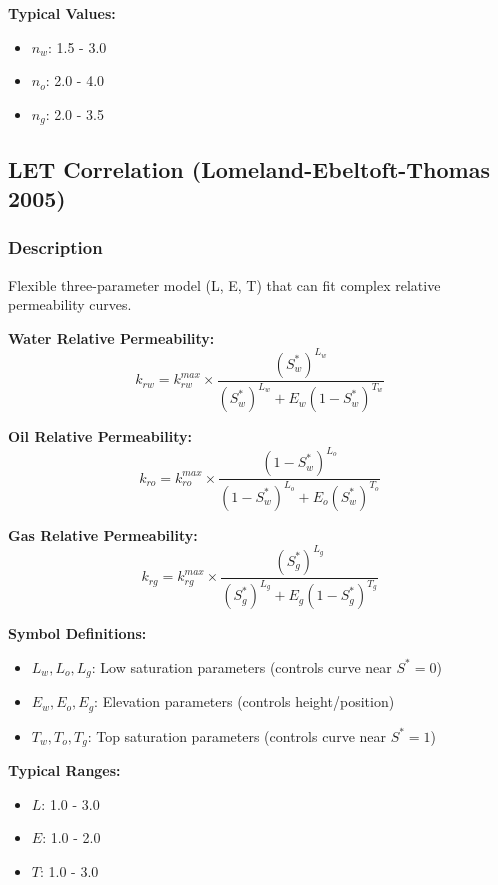 \documentclass[11pt,a4paper]{article}
\newcommand{\symitem}[2]{\item \textbf{#1}: #2}
\begin{document}
\textbf{Typical Values:}
\begin{itemize}
\item $n_w$: 1.5 - 3.0
\item $n_o$: 2.0 - 4.0
\item $n_g$: 2.0 - 3.5
\end{itemize}

\subsection{LET Correlation (Lomeland-Ebeltoft-Thomas 2005)}

\subsubsection{Description}
Flexible three-parameter model (L, E, T) that can fit complex relative permeability curves.

\begin{tcolorbox}[colback=formulabox,colframe=black!75]
\textbf{Water Relative Permeability:}
\begin{equation}
k_{rw} = k_{rw}^{max} \times \frac{(S_w^*)^{L_w}}{(S_w^*)^{L_w} + E_w (1 - S_w^*)^{T_w}}
\end{equation}

\textbf{Oil Relative Permeability:}
\begin{equation}
k_{ro} = k_{ro}^{max} \times \frac{(1 - S_w^*)^{L_o}}{(1 - S_w^*)^{L_o} + E_o (S_w^*)^{T_o}}
\end{equation}

\textbf{Gas Relative Permeability:}
\begin{equation}
k_{rg} = k_{rg}^{max} \times \frac{(S_g^*)^{L_g}}{(S_g^*)^{L_g} + E_g (1 - S_g^*)^{T_g}}
\end{equation}
\end{tcolorbox}

\textbf{Symbol Definitions:}
\begin{itemize}[leftmargin=2cm]
\symitem{$L_w, L_o, L_g$}{Low saturation parameters (controls curve near $S^*=0$)}
\symitem{$E_w, E_o, E_g$}{Elevation parameters (controls height/position)}
\symitem{$T_w, T_o, T_g$}{Top saturation parameters (controls curve near $S^*=1$)}
\end{itemize}

\textbf{Typical Ranges:}
\begin{itemize}
\item $L$: 1.0 - 3.0
\item $E$: 1.0 - 2.0
\item $T$: 1.0 - 3.0
\end{itemize}
\end{document}
